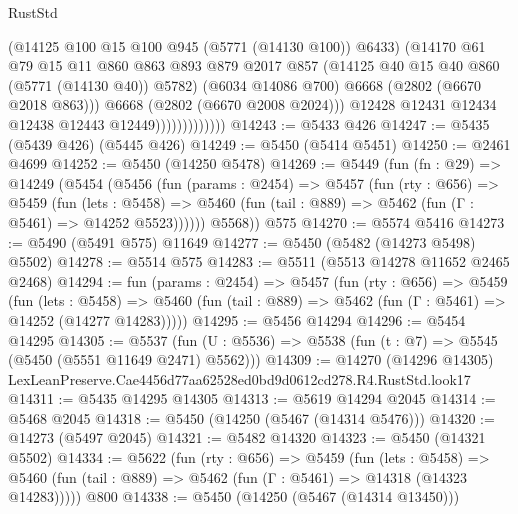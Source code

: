 \begin{lexlean}{RustStd}
\begin{coremodule}
                                (@14125 @100 @15 @100 @945 (@5771 (@14130 @100)) @6433)
                                (@14170
                                  @61
                                  @79
                                  @15
                                  @11
                                  @860
                                  @863
                                  @893
                                  @879
                                  @2017
                                  @857
                                  (@14125 @40 @15 @40 @860 (@5771 (@14130 @40)) @5782)
                                  (@6034 @14086 @700)
                                  @6668
                                  (@2802 (@6670 @2018 @863)))
                                @6668
                                (@2802 (@6670 @2008 @2024)))
                              @12428
                              @12431
                              @12434
                              @12438
                              @12443
                              @12449)))))))))))))
@14243 := @5433 @426
@14247 := @5435 (@5439 @426) (@5445 @426)
@14249 := @5450 (@5414 @5451)
@14250 := @2461 @4699
@14252 := @5450 (@14250 @5478)
@14269 := @5449
    (fun (fn : @29) =>
    @14249
      (@5454
        (@5456
          (fun (params : @2454) =>
          @5457
            (fun (rty : @656) =>
            @5459
              (fun (lets : @5458) =>
              @5460 (fun (tail : @889) => @5462 (fun (Γ : @5461) => @14252 @5523))))))
        @5568))
    @575
@14270 := @5574 @5416
@14273 := @5490 (@5491 @575) @11649
@14277 := @5450 (@5482 (@14273 @5498) @5502)
@14278 := @5514 @575
@14283 := @5511 (@5513 @14278 @11652 @2465 @2468)
@14294 := fun (params : @2454) =>
  @5457
    (fun (rty : @656) =>
    @5459
      (fun (lets : @5458) =>
      @5460 (fun (tail : @889) => @5462 (fun (Γ : @5461) => @14252 (@14277 @14283)))))
@14295 := @5456 @14294
@14296 := @5454 @14295
@14305 := @5537
    (fun (U : @5536) => @5538 (fun (t : @7) => @5545 (@5450 (@5551 @11649 @2471) @5562)))
@14309 := @14270 (@14296 @14305) LexLeanPreserve.Cae4456d77aa62528ed0bd9d0612cd278.R4.RustStd.look17
@14311 := @5435 @14295 @14305
@14313 := @5619 @14294 @2045
@14314 := @5468 @2045
@14318 := @5450 (@14250 (@5467 (@14314 @5476)))
@14320 := @14273 (@5497 @2045)
@14321 := @5482 @14320
@14323 := @5450 (@14321 @5502)
@14334 := @5622
    (fun (rty : @656) =>
    @5459
      (fun (lets : @5458) =>
      @5460 (fun (tail : @889) => @5462 (fun (Γ : @5461) => @14318 (@14323 @14283)))))
    @800
@14338 := @5450 (@14250 (@5467 (@14314 @13450)))

\end{coremodule}
\end{lexlean}
